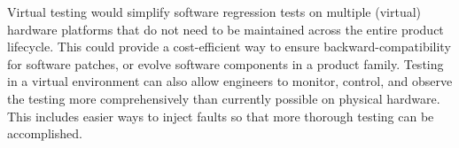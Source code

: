 Virtual testing would simplify software regression tests on multiple (virtual) hardware platforms that do not need to be maintained across the entire product lifecycle.
This could provide a cost-efficient way to ensure backward-compatibility for software patches, or evolve software components in a product family.
%
Testing in a virtual environment can also allow engineers to monitor, control, and observe the testing more comprehensively than currently possible on physical hardware.
This includes easier ways to inject faults so that more thorough testing can be accomplished.
